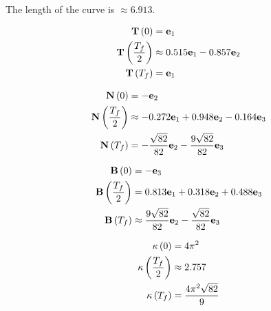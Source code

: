 \documentclass{article}
\begin{document}






The length of the curve is $\approx 6.913$.



\begin{align*}
  \textbf{T} \left ( 0 \right) &= \textbf{e}_1 \\
  \textbf{T} \left ( \frac{T_f}{2} \right) & \approx 0.515 \textbf{e}_1 - 0.857 \textbf{e}_2 \\
  \textbf{T} \left ( T_f \right) &= \textbf{e}_1 \\
\end{align*}



\begin{align*}
  \textbf{N} \left ( 0 \right) &= - \textbf{e}_2 \\
  \textbf{N} \left ( \frac{T_f}{2} \right) & \approx - 0.272 \textbf{e}_1 + 0.948 \textbf{e}_2 - 0.164 \textbf{e}_3 \\
  \textbf{N} \left ( T_f \right) &= - \frac{\sqrt{82}}{82} \textbf{e}_2 - \frac{9 \sqrt{82}}{82} \textbf{e}_3 \\
\end{align*}



\begin{align*}
  \textbf{B} \left ( 0 \right) &= - \textbf{e}_3 \\
  \textbf{B} \left ( \frac{T_f}{2} \right) &= 0.813 \textbf{e}_1 + 0.318 \textbf{e}_2 + 0.488 \textbf{e}_3 \\
  \textbf{B} \left ( T_f \right) & \approx \frac{9 \sqrt{82}}{82} \textbf{e}_2 - \frac{\sqrt{82}}{82} \textbf{e}_3 \\
\end{align*}








\begin{align*}
  \kappa \left ( 0 \right) &= 4 \pi^2 \\
  \kappa \left ( \frac{T_f}{2} \right) & \approx 2.757  \\
  \kappa \left ( T_f \right) &= \frac{4 \pi^2 \sqrt{82}}{9}\\
\end{align*}
\end{document}
